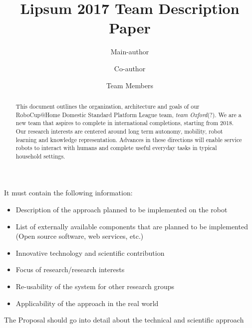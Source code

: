 \documentclass[runningheads,a4paper]{llncs}
\begin{document}
\title{Lipsum 2017 Team Description Paper}

\author{Main-author \and Co-author \and Team Members }
\maketitle



\begin{abstract}
This document outlines the organization, architecture and goals of our
RoboCup@Home Domestic Standard Platform League team, \textit{team Oxford}(?). 
We are a new team that aspires to complete in international completions,
starting from 2018. Our research interests are centered around long term
autonomy, mobility, robot learning and knowledge representation. %
Advances in these directions will enable service robots to interact with humans
and complete useful everyday tasks in typical household settings.

\end{abstract}



It must contain the following information:
\begin{itemize}
    \item Description of the approach planned to be implemented on the robot
    \item List of externally available components that are planned to be
    implemented (Open source software, web services, etc.)
    \item Innovative technology and scientific contribution
    \item Focus of research/research interests
    \item Re-usability of the system for other research groups
    \item Applicability of the approach in the real world
\end{itemize}
The Proposal should go into detail about the technical and scientific approach


\end{document}
